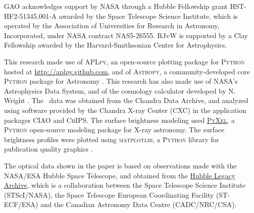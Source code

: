 GAO acknowledges support by NASA through a Hubble Fellowship grant HST-HF2-51345.001-A awarded by the Space Telescope Science Institute, which is operated by the Association of Universities for Research in Astronomy, Incorporated, under NASA contract NAS5-26555. RJvW is supported by a Clay Fellowship awarded by the Harvard-Smithsonian Center for Astrophysics.

This research made use of \textsc{APLpy}, an open-source plotting package for \textsc{Python} hosted at \url{http://aplpy.github.com}, and of \textsc{Astropy}, a community-developed core \textsc{Python} package
  for Astronomy \citep{astropy}. This research has also made use of NASA's Astrophysics Data System, and of the cosmology calculator developed by N. Wright \citep{Wright2006}. The \chandra\ data was obtained from the Chandra Data Archive, and analyzed using software provided by the Chandra X-ray Center (CXC) in the application packages \textsc{CIAO} and \textsc{ChIPS}. The surface brightness modeling used \href{https://github.com/gogrean/PyXel}{\textsc{PyXel}}, a \textsc{Python} open-source modeling package for X-ray astronomy. The surface brightness profiles were plotted using \textsc{matplotlib}, a \textsc{Python} library for publication quality graphics \citep{Hunter2007}.
  
 The optical data shown in the paper is based on observations made with the NASA/ESA Hubble Space Telescope, and obtained from the \href{http://hla.stsci.edu/}{Hubble Legacy Archive}, which is a collaboration between the Space Telescope Science Institute (STScI/NASA), the Space Telescope European Coordinating Facility (ST-ECF/ESA) and the Canadian Astronomy Data Centre (CADC/NRC/CSA).